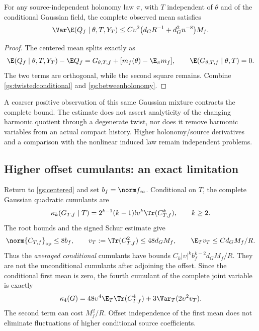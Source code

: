 \begin{proposition}
\label{gs:holonomy}
For any source-independent holonomy law \(\pi\), with \(T\) independent of
\(\theta\) and of the conditional Gaussian field, the complete observed mean
satisfies
\begin{equation}
 \Var\E(Q_f\mid\theta,T,Y_T)
 \le C\upsilon^2\bigl(d_GR^{-1}+d_G^2n^{-8}\bigr)M_f.
 \label{gs:fullholonomy}
\end{equation}
\end{proposition}
\begin{proof}
The centered mean splits exactly as
\[
 \E(Q_f\mid\theta,T,Y_T)-\E Q_f
 =G_{\theta,T,f}+[m_f(\theta)-\E_\pi m_f],
 \qquad \E(G_{\theta,T,f}\mid\theta,T)=0.
\]
The two terms are orthogonal, while the second square remains. Combine
\eqref{gs:twistedconditional} and \eqref{gs:betweenholonomy}.
\end{proof}
A coarser positive observation of this same Gaussian mixture contracts the
complete bound. The estimate does not assert analyticity of the changing
harmonic quotient through a degenerate twist, nor does it remove harmonic
variables from an actual compact history. Higher holonomy/source derivatives
and a comparison with the nonlinear induced law remain independent problems.

\subsection{Higher offset cumulants: an exact limitation}
\label{gs:higher}

Return to \eqref{gs:centered} and set \(b_f=\norm f_\infty\). Conditional on
\(T\), the complete Gaussian quadratic cumulants are
\begin{equation}
 \kappa_k(G_{T,f}\mid T)
 =2^{k-1}(k-1)!\upsilon^k\Tr(C_{T,f}^k),\qquad k\ge2.
 \label{gs:conditionalcumulants}
\end{equation}
The root bounds and the signed Schur estimate give
\begin{equation}
 \norm{C_{T,f}}_{\rm op}\le8b_f,\qquad
 v_T:=\Tr(C_{T,f}^2)\le48d_GM_f,
 \qquad \E_Tv_T\le Cd_GM_f/R.
 \label{gs:vmax}
\end{equation}
Thus the \emph{averaged conditional} cumulants have bounds
\(C_k|\upsilon|^kb_f^{k-2}d_GM_f/R\). They are not the unconditional
cumulants after adjoining the offset. Since the conditional first mean is zero,
the fourth cumulant of the complete joint variable is exactly
\begin{equation}
 \kappa_4(G)
 =48\upsilon^4\E_T\Tr(C_{T,f}^4)
      +3\Var_T(2\upsilon^2v_T).
 \label{gs:fourthmixture}
\end{equation}
The second term can cost \(M_f^2/R\). Offset independence of the first mean
does not eliminate fluctuations of higher conditional source coefficients.

